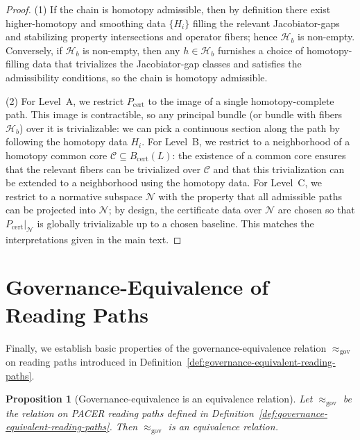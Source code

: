 \documentclass[11pt]{book}
\theoremstyle{plain}
\newtheorem{proposition}[theorem]{Proposition}
\theoremstyle{definition}
\theoremstyle{remark}
\begin{document}
\begin{proof}
(1) If the chain is homotopy admissible, then by definition there exist
higher-homotopy and smoothing data $\{H_i\}$ filling the relevant
Jacobiator-gaps and stabilizing property intersections and operator
fibers; hence $\mathcal{H}_b$ is non-empty. Conversely, if
$\mathcal{H}_b$ is non-empty, then any $h\in\mathcal{H}_b$ furnishes a
choice of homotopy-filling data that trivializes the Jacobiator-gap
classes and satisfies the admissibility conditions, so the chain is
homotopy admissible.

(2) For Level~A, we restrict $P_{\mathrm{cert}}$ to the image of a
single homotopy-complete path. This image is contractible, so any
principal bundle (or bundle with fibers $\mathcal{H}_b$) over it is
trivializable: we can pick a continuous section along the path by
following the homotopy data $H_i$. For Level~B, we restrict to a
neighborhood of a homotopy common core
$\mathcal{C}\subseteq B_{\mathrm{cert}}(L)$: the existence of a common
core ensures that the relevant fibers can be trivialized over
$\mathcal{C}$ and that this trivialization can be extended to a
neighborhood using the homotopy data. For Level~C, we restrict to a
normative subspace $\mathcal{N}$ with the property that all admissible
paths can be projected into $\mathcal{N}$; by design, the certificate
data over $\mathcal{N}$ are chosen so that
$P_{\mathrm{cert}}|_{\mathcal{N}}$ is globally trivializable up to a
chosen baseline. This matches the interpretations given in the main
text.
\end{proof}

\section{Governance-Equivalence of Reading Paths}

Finally, we establish basic properties of the governance-equivalence
relation $\approx_{\mathrm{gov}}$ on reading paths introduced in
Definition~\ref{def:governance-equivalent-reading-paths}.

\begin{proposition}[Governance-equivalence is an equivalence relation]
\label{prop:gov-equivalence-equivalence}
Let $\approx_{\mathrm{gov}}$ be the relation on PACER reading paths
defined in Definition~\ref{def:governance-equivalent-reading-paths}.
Then $\approx_{\mathrm{gov}}$ is an equivalence relation.
\end{proposition}
\end{document}
